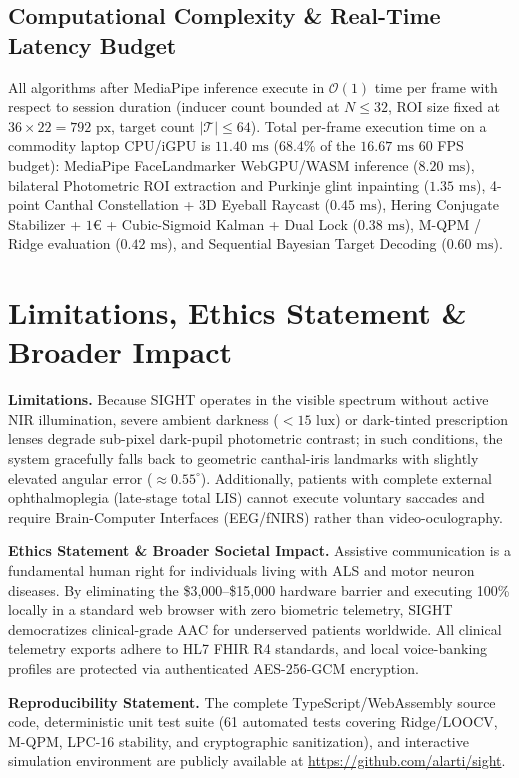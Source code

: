 \documentclass[twocolumn,10pt]{article}
\begin{document}
\subsection{Computational Complexity & Real-Time Latency Budget}
All algorithms after MediaPipe inference execute in $\mathcal{O}(1)$ time per frame with respect to session duration (inducer count bounded at $N \le 32$, ROI size fixed at $36 \times 22 = 792\text{ px}$, target count $|\mathcal{T}| \le 64$). Total per-frame execution time on a commodity laptop CPU/iGPU is $11.40\text{ ms}$ ($68.4\%$ of the $16.67\text{ ms}$ 60 FPS budget): MediaPipe FaceLandmarker WebGPU/WASM inference ($8.20\text{ ms}$), bilateral Photometric ROI extraction and Purkinje glint inpainting ($1.35\text{ ms}$), 4-point Canthal Constellation + 3D Eyeball Raycast ($0.45\text{ ms}$), Hering Conjugate Stabilizer + $1\text{€}$ + Cubic-Sigmoid Kalman + Dual Lock ($0.38\text{ ms}$), M-QPM / Ridge evaluation ($0.42\text{ ms}$), and Sequential Bayesian Target Decoding ($0.60\text{ ms}$).

\section{Limitations, Ethics Statement & Broader Impact}
\label{sec:limitations}
\textbf{Limitations.} Because SIGHT operates in the visible spectrum without active NIR illumination, severe ambient darkness ($<15\text{ lux}$) or dark-tinted prescription lenses degrade sub-pixel dark-pupil photometric contrast; in such conditions, the system gracefully falls back to geometric canthal-iris landmarks with slightly elevated angular error ($\approx 0.55^\circ$). Additionally, patients with complete external ophthalmoplegia (late-stage total LIS) cannot execute voluntary saccades and require Brain-Computer Interfaces (EEG/fNIRS) rather than video-oculography.

\textbf{Ethics Statement & Broader Societal Impact.} Assistive communication is a fundamental human right for individuals living with ALS and motor neuron diseases. By eliminating the \$3,000--\$15,000 hardware barrier and executing 100\% locally in a standard web browser with zero biometric telemetry, SIGHT democratizes clinical-grade AAC for underserved patients worldwide. All clinical telemetry exports adhere to HL7 FHIR R4 standards, and local voice-banking profiles are protected via authenticated AES-256-GCM encryption.

\textbf{Reproducibility Statement.} The complete TypeScript/WebAssembly source code, deterministic unit test suite (61 automated tests covering Ridge/LOOCV, M-QPM, LPC-16 stability, and cryptographic sanitization), and interactive simulation environment are publicly available at \url{https://github.com/alarti/sight}.
\end{document}
